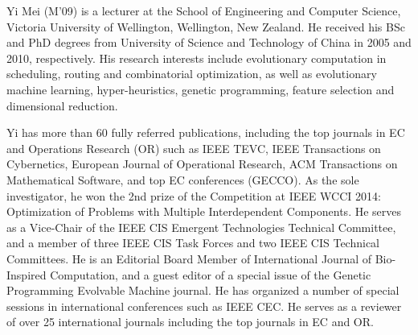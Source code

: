 \documentclass[10pt,journal,compsoc]{IEEEtran}
\begin{document}
\begin{IEEEbiography}{Yi Mei} (M’09)
is a lecturer at the School of Engineering and Computer Science, Victoria University of Wellington, Wellington, New Zealand. He received his BSc and PhD degrees from University of Science and Technology of China in 2005 and 2010, respectively. His research interests include evolutionary computation in scheduling, routing and combinatorial optimization, as well as evolutionary machine learning, hyper-heuristics, genetic programming, feature selection and dimensional reduction.

Yi has more than 60 fully referred publications, including the top journals in EC and Operations Research (OR) such as IEEE TEVC, IEEE Transactions on Cybernetics, European Journal of Operational Research, ACM Transactions on Mathematical Software, and top EC conferences (GECCO). As the sole investigator, he won the 2nd prize of the Competition at IEEE WCCI 2014: Optimization of Problems with Multiple Interdependent Components. He serves as a Vice-Chair of the IEEE CIS Emergent Technologies Technical Committee, and a member of three IEEE CIS Task Forces and two IEEE CIS Technical Committees. He is an Editorial Board Member of International Journal of Bio-Inspired Computation, and a guest editor of a special issue of the Genetic Programming Evolvable Machine journal. He has organized a number of special sessions in international conferences such as IEEE CEC. He serves as a reviewer of over 25 international journals including the top journals in EC and OR.
\end{IEEEbiography}
\end{document}
